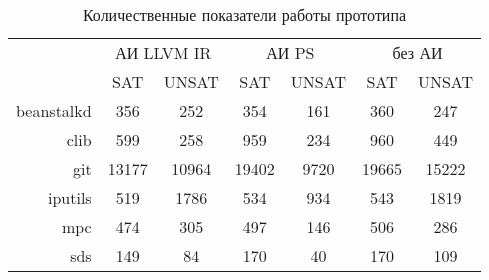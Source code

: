 \begin{table}
\caption{Количественные показатели работы прототипа}
\centering
\footnotesize
\begin{tabular}{|r|c|c|c|c|c|c|}
\hline
            \multirow{2}{*}{}
           & \multicolumn{2}{c|}{АИ LLVM IR} 
           & \multicolumn{2}{c|}{АИ PS} 
           & \multicolumn{2}{c|}{без АИ} \\ \cline{2-7}
           & SAT    & UNSAT   & SAT    & UNSAT   & SAT    & UNSAT   \\ \hline
beanstalkd & 356    & 252     & 354    & 161     & 360    & 247     \\ \hline
clib       & 599    & 258     & 959    & 234     & 960    & 449     \\ \hline
git        & 13177  & 10964   & 19402  & 9720    & 19665  & 15222   \\ \hline
iputils    & 519    & 1786    & 534    & 934     & 543    & 1819    \\ \hline
mpc        & 474    & 305     & 497    & 146     & 506    & 286     \\ \hline
sds        & 149    & 84      & 170    & 40      & 170    & 109     \\ \hline
\end{tabular}
\label{table:checkResults}
\end{table}